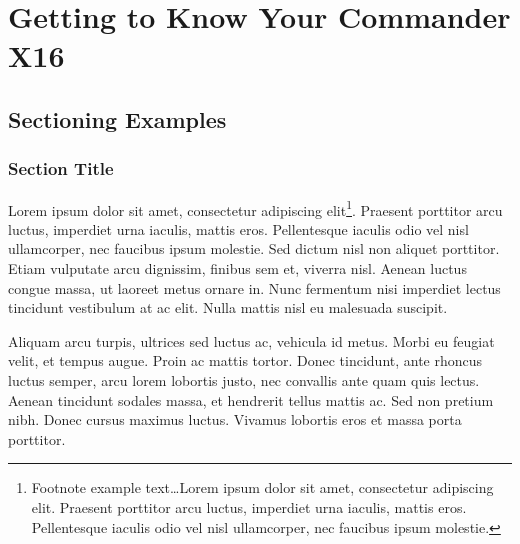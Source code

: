 \documentclass[
	11pt, %
	fleqn, %
	letterpaper, %
]{CommodoreBlueBook}
\begin{document}

\makeatletter\@openrightfalse
\part{Getting to Know Your Commander X16}




\chapter{Sectioning Examples}

\section{Section Title}

Lorem ipsum dolor sit amet, consectetur adipiscing elit\footnote{Footnote
example text\ldots Lorem ipsum dolor sit amet, consectetur adipiscing elit.
Praesent porttitor arcu luctus, imperdiet urna iaculis, mattis eros.
Pellentesque iaculis odio vel nisl ullamcorper, nec faucibus ipsum molestie.}.
Praesent porttitor arcu luctus, imperdiet urna iaculis, mattis eros.
Pellentesque iaculis odio vel nisl ullamcorper, nec faucibus ipsum molestie.
Sed dictum nisl non aliquet porttitor. Etiam vulputate arcu dignissim, finibus
sem et, viverra nisl. Aenean luctus congue massa, ut laoreet metus ornare in.
Nunc fermentum nisi imperdiet lectus tincidunt vestibulum at ac elit. Nulla
mattis nisl eu malesuada suscipit.

Aliquam arcu turpis, ultrices sed luctus ac, vehicula id metus. Morbi eu
feugiat velit, et tempus augue. Proin ac mattis tortor. Donec tincidunt, ante
rhoncus luctus semper, arcu lorem lobortis justo, nec convallis ante quam quis
lectus. Aenean tincidunt sodales massa, et hendrerit tellus mattis ac. Sed non
pretium nibh. Donec cursus maximus luctus. Vivamus lobortis eros et massa porta
porttitor.
\end{document}
